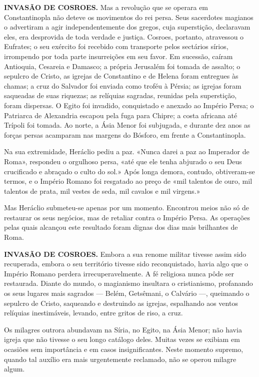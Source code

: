 \documentclass[11pt,a5paper,twoside,openany]{book}
\begin{document}
\textbf{INVASÃO DE COSROES.} Mas a revolução que se operara em Constantinopla não deteve os movimentos do rei persa. Seus sacerdotes magianos o advertiram a agir independentemente dos gregos, cuja superstição, declaravam eles, era desprovida de toda verdade e justiça. Cosroes, portanto, atravessou o Eufrates; o seu exército foi recebido com transporte pelos sectários sírios, irrompendo por toda parte insurreições em seu favor. Em sucessão, caíram Antioquia, Cesareia e Damasco; a própria Jerusalém foi tomada de assalto; o sepulcro de Cristo, as igrejas de Constantino e de Helena foram entregues às chamas; a cruz do Salvador foi enviada como troféu à Pérsia; as igrejas foram saqueadas de suas riquezas; as relíquias sagradas, reunidas pela superstição, foram dispersas. O Egito foi invadido, conquistado e anexado ao Império Persa; o Patriarca de Alexandria escapou pela fuga para Chipre; a costa africana até Trípoli foi tomada. Ao norte, a Ásia Menor foi subjugada, e durante dez anos as forças persas acamparam nas margens do Bósforo, em frente a Constantinopla.

Na sua extremidade, Heráclio pediu a paz. «Nunca darei a paz ao Imperador de Roma», respondeu o orgulhoso persa, «até que ele tenha abjurado o seu Deus crucificado e abraçado o culto do sol.» Após longa demora, contudo, obtiveram-se termos, e o Império Romano foi resgatado ao preço de «mil talentos de ouro, mil talentos de prata, mil vestes de seda, mil cavalos e mil virgens.»

Mas Heráclio submeteu-se apenas por um momento. Encontrou meios não só de restaurar os seus negócios, mas de retaliar contra o Império Persa. As operações pelas quais alcançou este resultado foram dignas dos dias mais brilhantes de Roma.

\textbf{INVASÃO DE COSROES.} Embora a sua renome militar tivesse assim sido recuperada, embora o seu território tivesse sido reconquistado, havia algo que o Império Romano perdera irrecuperavelmente. A fé religiosa nunca pôde ser restaurada. Diante do mundo, o magianismo insultara o cristianismo, profanando os seus lugares mais sagrados — Belém, Getsêmani, o Calvário —, queimando o sepulcro de Cristo, saqueando e destruindo as igrejas, espalhando aos ventos relíquias inestimáveis, levando, entre gritos de riso, a cruz.

Os milagres outrora abundavam na Síria, no Egito, na Ásia Menor; não havia igreja que não tivesse o seu longo catálogo deles. Muitas vezes se exibiam em ocasiões sem importância e em casos insignificantes. Neste momento supremo, quando tal auxílio era mais urgentemente reclamado, não se operou milagre algum.
\end{document}
